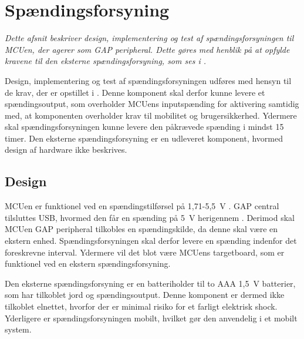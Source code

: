 \section{Spændingsforsyning}\label{spaendingsforsyning}
\textit{Dette afsnit beskriver design, implementering og test af spændingsforsyningen til MCUen, der agerer som GAP peripheral. Dette gøres med henblik på at opfylde kravene til den eksterne spændingsforsyning, som ses i .}

Design, implementering og test af spændingsforsyningen udføres med hensyn til de krav, der er opstillet i . \newline
Denne komponent skal derfor kunne levere et spændingsoutput, som overholder MCUens inputspænding for aktivering samtidig med, at komponenten overholder krav til mobilitet og brugersikkerhed. Ydermere skal spændingsforsyningen kunne levere den påkrævede spænding i mindst 15 timer. \newline
Den eksterne spændingsforsyning er en udleveret komponent, hvormed design af hardware ikke beskrives. 

\subsection{Design}
MCUen er funktionel ved en spændingstilførsel på 1,71-5,5~V \citep{Semiconductor20164200M,Semiconductor2016PRoC}. GAP central tilsluttes USB, hvormed den får en spænding på 5~V herigennem \citep{Semiconductor2016}. Derimod skal MCUen GAP peripheral tilkobles en spændingskilde, da denne skal være en ekstern enhed. Spændingsforsyningen skal derfor levere en spænding indenfor det foreskrevne interval. Ydermere vil det blot være MCUens targetboard, som er funktionel ved en ekstern spændingsforsyning.

Den eksterne spændingsforsyning er en batteriholder til to AAA 1,5~V batterier, som har tilkoblet jord og spændingsoutput. Denne komponent er dermed ikke tilkoblet elnettet, hvorfor der er minimal risiko for et farligt elektrisk shock. Yderligere er spændingsforsyningen mobilt, hvilket gør den anvendelig i et mobilt system.

